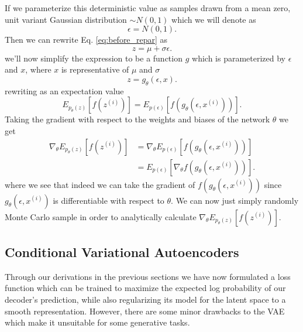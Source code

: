 If we parameterize this deterministic value as samples drawn 
from a mean zero, unit variant Gaussian distribution 
$\sim N(0, 1)$ which we will denote as 
\begin{equation}
    \epsilon = N(0, 1).
\end{equation}
Then we can rewrite Eq. \ref{eq:before_repar} as 
\begin{equation}
    z = \mu + \sigma \epsilon.
\end{equation}
we'll now simplify the expression to be a function 
$g$ which is parameterized by $\epsilon$ and $x$, 
where $x$ is representative of $\mu$ and $\sigma$
\begin{equation}
    z = g_{\theta}(\epsilon, x).
\end{equation}
rewriting as an expectation value 
\begin{equation}
    E_{p_{\theta}(z)}[f(z^{(i)})] = E_{p(\epsilon)}[
    f(g_{\theta}(\epsilon, x^{(i)}))].
\end{equation}
Taking the gradient with respect to the weights 
and biases of the network $\theta$ we get 
\begin{align}
    \nabla_{\theta} E_{p_{\theta}(z)}[f(z^{(i)})] &= \nabla_{\theta} E_{p(\epsilon)}[
    f(g_{\theta}(\epsilon, x^{(i)}))] \nonumber \\
    &= E_{p(\epsilon)}[ \nabla_{\theta}
    f(g_{\theta}(\epsilon, x^{(i)}))].
\end{align}
where we see that indeed we can take the gradient 
of $f(g_{\theta}(\epsilon, x^{(i)}))$ since 
$g_{\theta}(\epsilon, x^{(i)})$ is differentiable 
with respect to $\theta$. We can now just simply 
randomly Monte Carlo sample in order to analytically 
calculate $\nabla_{\theta} E_{p_{\theta}(z)}[f(z^{(i)})]$.

%
%
\subsection{Conditional Variational Autoencoders}

Through our derivations in the previous sections 
we have now formulated a loss function which can be trained 
to maximize the expected log probability of our 
decoder's prediction, while also regularizing its
model for the latent space to a smooth representation. 
However, there are some minor drawbacks to the \ac{VAE} 
which make it unsuitable for some generative tasks. 

